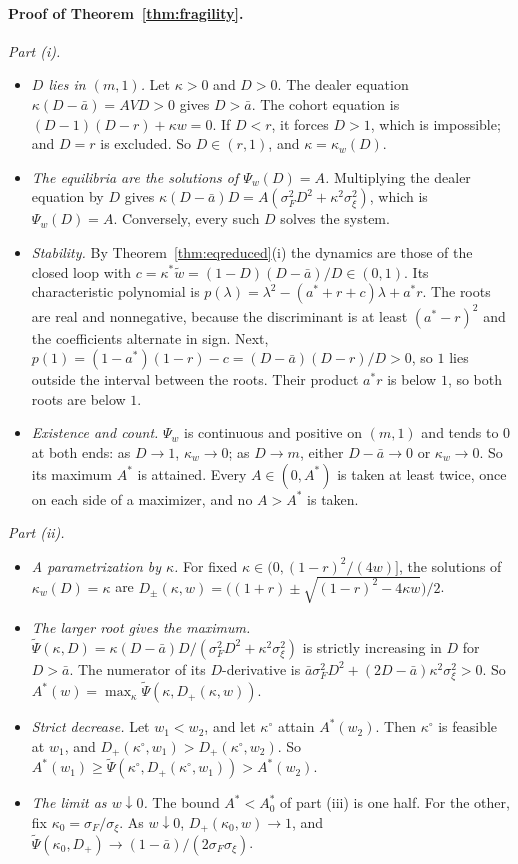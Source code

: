 \documentclass[12pt]{article}
\theoremstyle{definition}
\theoremstyle{remark}
\begin{document}
\paragraph{Proof of Theorem~\ref{thm:fragility}.}
\emph{Part (i).}
\begin{itemize}[itemsep=1pt,topsep=2pt]
\item \emph{$D$ lies in $(m,1)$.} Let $\kappa>0$ and $D>0$. The dealer equation $\kappa(D-\bar a)=AVD>0$ gives $D>\bar a$. The cohort equation is $(D-1)(D-r)+\kappa w=0$. If $D<r$, it forces $D>1$, which is impossible; and $D=r$ is excluded. So $D\in(r,1)$, and $\kappa=\kappa_w(D)$.
\item \emph{The equilibria are the solutions of $\Psi_w(D)=A$.} Multiplying the dealer equation by $D$ gives $\kappa(D-\bar a)D=A(\sigma_F^2D^2+\kappa^2\sigma_\xi^2)$, which is $\Psi_w(D)=A$. Conversely, every such $D$ solves the system.
\item \emph{Stability.} By Theorem~\ref{thm:eqreduced}(i) the dynamics are those of the closed loop with $c=\kappa^*\tilde w=(1-D)(D-\bar a)/D\in(0,1)$. Its characteristic polynomial is $p(\lambda)=\lambda^2-(a^*+r+c)\lambda+a^*r$. The roots are real and nonnegative, because the discriminant is at least $(a^*-r)^2$ and the coefficients alternate in sign. Next, $p(1)=(1-a^*)(1-r)-c=(D-\bar a)(D-r)/D>0$, so $1$ lies outside the interval between the roots. Their product $a^*r$ is below $1$, so both roots are below $1$.
\item \emph{Existence and count.} $\Psi_w$ is continuous and positive on $(m,1)$ and tends to $0$ at both ends: as $D\to1$, $\kappa_w\to0$; as $D\to m$, either $D-\bar a\to0$ or $\kappa_w\to0$. So its maximum $A^*$ is attained. Every $A\in(0,A^*)$ is taken at least twice, once on each side of a maximizer, and no $A>A^*$ is taken.
\end{itemize}

\emph{Part (ii).}
\begin{itemize}[itemsep=1pt,topsep=2pt]
\item \emph{A parametrization by $\kappa$.} For fixed $\kappa\in(0,(1-r)^2/(4w)]$, the solutions of $\kappa_w(D)=\kappa$ are $D_\pm(\kappa,w)=\bigl((1+r)\pm\sqrt{(1-r)^2-4\kappa w}\bigr)/2$.
\item \emph{The larger root gives the maximum.} $\tilde\Psi(\kappa,D)=\kappa(D-\bar a)D/(\sigma_F^2D^2+\kappa^2\sigma_\xi^2)$ is strictly increasing in $D$ for $D>\bar a$. The numerator of its $D$-derivative is $\bar a\sigma_F^2D^2+(2D-\bar a)\kappa^2\sigma_\xi^2>0$. So $A^*(w)=\max_\kappa\tilde\Psi(\kappa,D_+(\kappa,w))$.
\item \emph{Strict decrease.} Let $w_1<w_2$, and let $\kappa^\circ$ attain $A^*(w_2)$. Then $\kappa^\circ$ is feasible at $w_1$, and $D_+(\kappa^\circ,w_1)>D_+(\kappa^\circ,w_2)$. So $A^*(w_1)\ge\tilde\Psi(\kappa^\circ,D_+(\kappa^\circ,w_1))>A^*(w_2)$.
\item \emph{The limit as $w\downarrow0$.} The bound $A^*<A^*_0$ of part (iii) is one half. For the other, fix $\kappa_0=\sigma_F/\sigma_\xi$. As $w\downarrow0$, $D_+(\kappa_0,w)\to1$, and $\tilde\Psi(\kappa_0,D_+)\to(1-\bar a)/(2\sigma_F\sigma_\xi)$.
\end{itemize}
\end{document}

